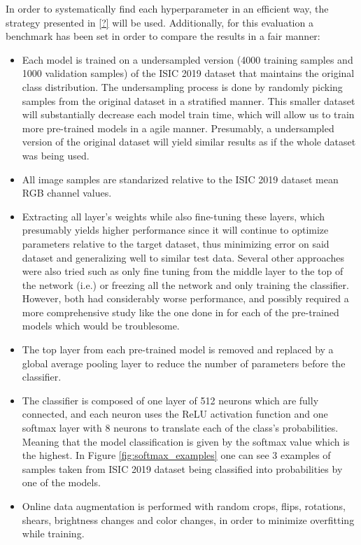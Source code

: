     In order to systematically find each hyperparameter in an efficient way, the strategy presented in \ref{?} will be used. Additionally, for this evaluation a benchmark has been set in order to compare the results in a fair manner:
    \begin{itemize}
        \item Each model is trained on a undersampled version (4000 training samples and 1000 validation samples) of the ISIC 2019 dataset that maintains the original class distribution. The undersampling process is done by randomly picking samples from the original dataset in a stratified manner. This smaller dataset will substantially decrease each model train time, which will allow us to train more pre-trained models in a agile manner. Presumably, a undersampled version of the original dataset will yield similar results as if the whole dataset was being used. 
        \item All image samples are standarized relative to the ISIC 2019 dataset mean RGB channel values.
        \item Extracting all layer's weights while also fine-tuning these layers, which presumably yields higher performance since it will continue to optimize parameters relative to the target dataset, thus minimizing error on said dataset and generalizing well to similar test data. Several other approaches were also tried such as only fine tuning from the middle layer to the top of the network (i.e.) or freezing all the network and only training the classifier. However, both had considerably worse performance, and possibly required a more comprehensive study like the one done in \cite{maia} for each of the pre-trained models which would be troublesome.
        \item The top layer from each pre-trained model is removed and replaced by a global average pooling layer to reduce the number of parameters before the classifier. 
        \item The classifier is composed of one layer of 512 neurons which are fully connected, and each neuron uses the ReLU activation function and one softmax layer with 8 neurons to translate each of the class's probabilities. Meaning that the model classification is given by the softmax value which is the highest. In Figure \ref{fig:softmax_examples} one can see 3 examples of samples taken from ISIC 2019 dataset being classified into probabilities by one of the models.
        \item Online data augmentation is performed with random crops, flips, rotations, shears, brightness changes and color changes, in order to minimize overfitting while training.

\end{itemize}
